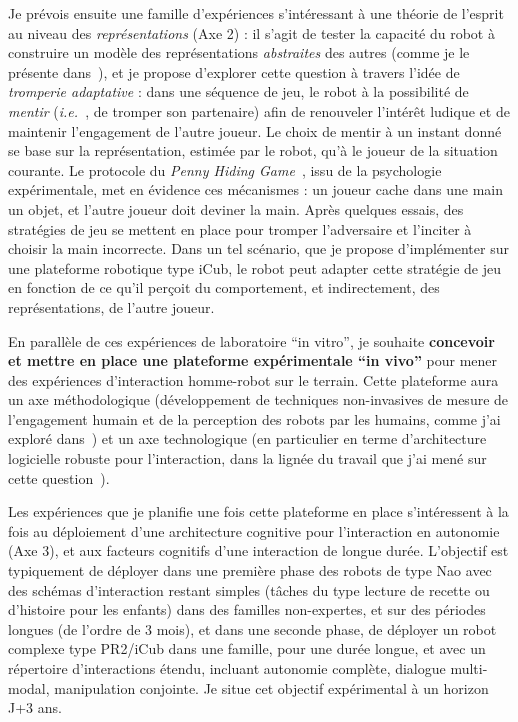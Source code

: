 \documentclass[a4paper]{article}
\newcommand{\ie}{{\textit{i.e.~}}}
\begin{document}
Je prévois ensuite une famille d'expériences s'intéressant à une théorie de
l'esprit au niveau des \emph{représentations} (Axe 2) : il s'agit de tester la
capacité du robot à construire un modèle des représentations \emph{abstraites}
des autres (comme je le présente dans~\cite{lemaignan2015mutual}), et je propose
d'explorer cette question à travers l'idée de \emph{tromperie adaptative} : dans
une séquence de jeu, le robot à la possibilité de \emph{mentir} (\ie, de tromper
son partenaire) afin de renouveler l'intérêt ludique et de maintenir
l'engagement de l'autre joueur. Le choix de mentir à un instant donné se base sur
la représentation, estimée par le robot, qu'à le joueur de la situation
courante. Le protocole du \emph{Penny Hiding Game}~\cite{oswald1989role}, issu
de la psychologie expérimentale, met en évidence ces mécanismes : un joueur
cache dans une main un objet, et l'autre joueur doit deviner la main.  Après
quelques essais, des stratégies de jeu se mettent en place pour tromper
l'adversaire et l'inciter à choisir la main incorrecte. Dans un tel scénario,
que je propose d'implémenter sur une plateforme robotique type iCub, le robot
peut adapter cette stratégie de jeu en fonction de ce qu'il perçoit du
comportement, et indirectement, des représentations, de l'autre joueur.

En parallèle de ces expériences de laboratoire ``in vitro'', je souhaite
\textbf{concevoir et mettre en place une plateforme expérimentale ``in vivo''}
pour mener des expériences d'interaction homme-robot sur le terrain. Cette
plateforme aura un axe méthodologique (développement de techniques non-invasives
de mesure de l'engagement humain et de la perception des robots par les humains,
comme j'ai exploré
dans~\cite{lemaignan2014dynamics,lemaignan2014cognitive,fink2015dynamics,sharma2015measuring})
et un axe technologique (en particulier en terme d'architecture logicielle
robuste pour l'interaction, dans la lignée du travail que j'ai mené sur cette
question~\cite{lemaignan2015human,lemaignan2015pyrobots}).

Les expériences que je planifie une fois cette plateforme en place s'intéressent
à la fois au déploiement d'une architecture cognitive pour l'interaction en
autonomie (Axe 3), et aux facteurs cognitifs d'une interaction de longue durée.
L'objectif est typiquement de déployer dans une première phase des robots de
type Nao avec des schémas d'interaction restant simples (tâches du type lecture
de recette ou d'histoire pour les enfants) dans des familles non-expertes, et
sur des périodes longues (de l'ordre de 3 mois), et dans une seconde phase, de
déployer un robot complexe type PR2/iCub dans une famille, pour une durée
longue, et avec un répertoire d'interactions étendu, incluant autonomie
complète, dialogue multi-modal, manipulation conjointe. Je situe cet objectif
expérimental à un horizon J+3 ans.
\end{document}
